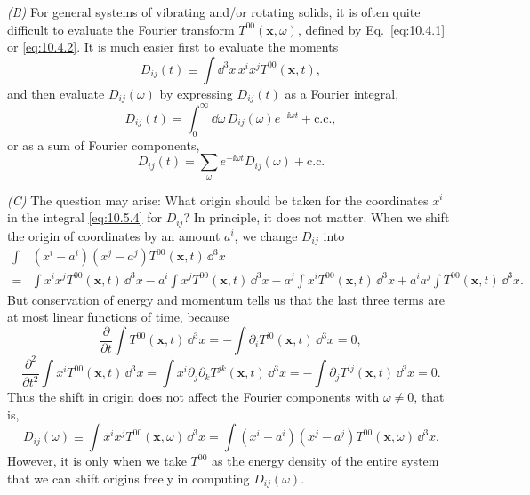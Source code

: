 \medskip
\noindent\textit{(B)} For general systems of vibrating and/or rotating
solids, it is often quite difficult to evaluate the Fourier transform
\(T^{00}(\mathbf{x},\omega)\), defined by Eq.~\eqref{eq:10.4.1} or
\eqref{eq:10.4.2}. It is much easier first to evaluate the moments
\begin{equation}
  D_{ij}(t)
  \equiv
  \int \dd^3x\,x^ix^jT^{00}(\mathbf{x},t),
  \tag{10.5.9}\label{eq:10.5.9}
\end{equation}
and then evaluate \(D_{ij}(\omega)\) by expressing \(D_{ij}(t)\) as a
Fourier integral,
\begin{equation}
  D_{ij}(t)
  =
  \int_0^\infty \dd\omega\,D_{ij}(\omega)e^{-\ii\omega t}
  +\text{c.c.},
  \tag{10.5.10}\label{eq:10.5.10}
\end{equation}
or as a sum of Fourier components,
\begin{equation}
  D_{ij}(t)
  =
  \sum_\omega e^{-\ii\omega t}D_{ij}(\omega)+\text{c.c.}
  \tag{10.5.11}\label{eq:10.5.11}
\end{equation}

\medskip
\noindent\textit{(C)} The question may arise: What origin should be taken for
the coordinates \(x^i\) in the integral \eqref{eq:10.5.4} for \(D_{ij}\)?
In principle, it does not matter. When we shift the origin of coordinates by
an amount \(a^i\), we change \(D_{ij}\) into
\begin{align*}
  \int &(x^i-a^i)(x^j-a^j)T^{00}(\mathbf{x},t)\,\dd^3x\\
  ={}&
  \int x^ix^jT^{00}(\mathbf{x},t)\,\dd^3x
  -a^i\int x^jT^{00}(\mathbf{x},t)\,\dd^3x
  -a^j\int x^iT^{00}(\mathbf{x},t)\,\dd^3x
  +a^ia^j\int T^{00}(\mathbf{x},t)\,\dd^3x.
\end{align*}
But conservation of energy and momentum tells us that the last three terms
are at most linear functions of time, because
\[
  \frac{\partial}{\partial t}\int T^{00}(\mathbf{x},t)\,\dd^3x
  =
  -\int\partial_iT^{i0}(\mathbf{x},t)\,\dd^3x
  =0,
\]
\[
  \frac{\partial^2}{\partial t^2}
  \int x^iT^{00}(\mathbf{x},t)\,\dd^3x
  =
  \int x^i\partial_j\partial_kT^{jk}(\mathbf{x},t)\,\dd^3x
  =
  -\int\partial_jT^{ij}(\mathbf{x},t)\,\dd^3x
  =0.
\]
Thus the shift in origin does not affect the Fourier components with
\(\omega\ne0\), that is,
\begin{equation}
  D_{ij}(\omega)
  \equiv
  \int x^ix^jT^{00}(\mathbf{x},\omega)\,\dd^3x
  =
  \int(x^i-a^i)(x^j-a^j)T^{00}(\mathbf{x},\omega)\,\dd^3x.
  \tag{10.5.12}\label{eq:10.5.12}
\end{equation}
However, it is only when we take \(T^{00}\) as the energy density of the
entire system that we can shift origins freely in computing
\(D_{ij}(\omega)\).

